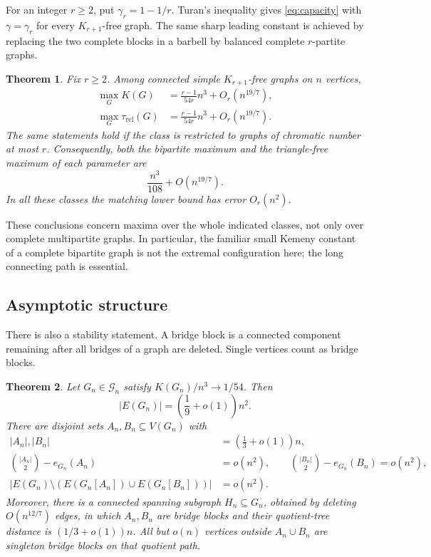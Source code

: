 \documentclass[11pt]{amsart}
\numberwithin{equation}{section}
\newtheorem{theorem}{Theorem}[section]
\theoremstyle{definition}
\theoremstyle{remark}
\newcommand{\trel}{\tau_{\mathrm{rel}}}
\newcommand{\cG}{\mathcal G}
\begin{document}
For an integer $r\ge2$, put $\gamma_r=1-1/r$. Turan's inequality gives \eqref{eq:capacity} with $\gamma=\gamma_r$ for every $K_{r+1}$-free graph. The same sharp leading constant is achieved by replacing the two complete blocks in a barbell by balanced complete $r$-partite graphs.

\begin{theorem}\label{thm:clique}
Fix $r\ge2$. Among connected simple $K_{r+1}$-free graphs on $n$ vertices,
\begin{align}
\max_G K(G)&=\frac{r-1}{54r}n^3+O_r(n^{19/7}),\label{eq:cliqueK}\\
\max_G\trel(G)&=\frac{r-1}{54r}n^3+O_r(n^{19/7}).\label{eq:cliqueR}
\end{align}
The same statements hold if the class is restricted to graphs of chromatic number at most $r$. Consequently, both the bipartite maximum and the triangle-free maximum of each parameter are
\[
\frac{n^3}{108}+O(n^{19/7}).
\]
In all these classes the matching lower bound has error $O_r(n^2)$.
\end{theorem}

These conclusions concern maxima over the whole indicated classes, not only over complete multipartite graphs. In particular, the familiar small Kemeny constant of a complete bipartite graph is not the extremal configuration here; the long connecting path is essential.

\subsection{Asymptotic structure}
There is also a stability statement. A bridge block is a connected component remaining after all bridges of a graph are deleted. Single vertices count as bridge blocks.

\begin{theorem}\label{thm:stability}
Let $G_n\in\cG_n$ satisfy $K(G_n)/n^3\to1/54$. Then
\begin{equation}\label{eq:edges-stability}
|E(G_n)|=\left(\frac19+o(1)\right)n^2.
\end{equation}
There are disjoint sets $A_n,B_n\subseteq V(G_n)$ with
\begin{align}
|A_n|,|B_n|&=\left(\frac13+o(1)\right)n,\label{eq:sizes-stability}\\
\binom{|A_n|}{2}-e_{G_n}(A_n)&=o(n^2),\qquad
\binom{|B_n|}{2}-e_{G_n}(B_n)=o(n^2),\label{eq:cliques-stability}\\
|E(G_n)\setminus(E(G_n[A_n])\cup E(G_n[B_n]))|&=o(n^2).\label{eq:outside-stability}
\end{align}
Moreover, there is a connected spanning subgraph $H_n\subseteq G_n$, obtained by deleting $O(n^{12/7})$ edges, in which $A_n,B_n$ are bridge blocks and their quotient-tree distance is $(1/3+o(1))n$. All but $o(n)$ vertices outside $A_n\cup B_n$ are singleton bridge blocks on that quotient path.
\end{theorem}
\end{document}
